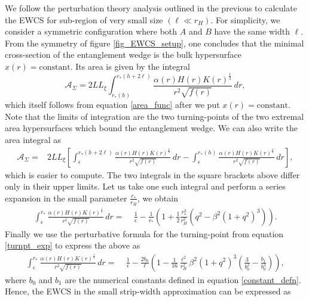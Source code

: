 \documentclass[12pt,a4paper]{article}
\numberwithin{equation}{section}
\begin{document}
We follow the perturbation theory analysis outlined in the previous to calculate the EWCS for sub-region of very small size $\left(\ell \ll r_H\right)$. For simplicity, we consider a symmetric configuration where both $A$ and $B$ have the same width $\ell$. From the symmetry of figure \ref{fig_EWCS_setup}, one concludes that the minimal cross-section of the entanglement wedge is the bulk hypersurface $x\left(r\right)=\mathrm{constant}$. Its area is given by the integral
%
\begin{equation} \label{area_func_EWCS}
	\mathcal{A}_{\Sigma} = 2 L L_{\xi} \int_{r_{\ast}\left(h\right)}^{r_{\ast}\left(h+2\ell\right)} \frac{\alpha(r) H(r) K(r)^\frac{1}{3}}{r^2 \sqrt{f\left(r\right)}}\,dr ,
\end{equation}
%
which itself follows from equation \eqref{area_func} after we put $x(r)=\text{constant}$. Note that the limits of integration are the two turning-points of the two extremal area hypersurfaces which bound the entanglement wedge. We can also write the area integral as
%
\begin{align} \label{area_func_EWCS}
	\mathcal{A}_{\Sigma} = &2 L L_{\xi} \left[ \int_{\epsilon}^{r_{\ast}\left(h+2\ell\right)} \frac{\alpha(r) H(r) K(r)^\frac{1}{3}}{r^2 \sqrt{f\left(r\right)}}\,dr - \int_{\epsilon}^{r_{\ast}\left(h\right)} \frac{\alpha(r) H(r) K(r)^\frac{1}{3}}{r^2 \sqrt{f\left(r\right)}}\,dr \right],
\end{align}
%
which is easier to compute. The two integrals in the square brackets above differ only in their upper limits. Let us take one such integral and perform a series expansion in the small parameter $\frac{r_{\ast}}{r_H}$, we obtain
%
\begin{align*}
    \int_{\epsilon}^{r_{\ast}} \frac{\alpha(r) H(r) K(r)^\frac{1}{3}}{r^2 \sqrt{f\left(r\right)}}\,dr =\; & \frac{1}{\epsilon} - \frac{1}{r_{\ast}} \left( 1 + \frac{1}{2} \frac{r_{\ast}^2}{r_H^2} \left( q^2 - \beta^2 \left(1 + q^2\right)^3 \right) \right).
\end{align*}
%
Finally we use the perturbative formula for the turning-point from equation \eqref{turnpt_exp} to express the above as
%
\begin{align}
    \int_{\epsilon}^{r_{\ast}} \frac{\alpha(r) H(r) K(r)^\frac{1}{3}}{r^2 \sqrt{f\left(r\right)}}\,dr =\; & \frac{1}{\epsilon} - \frac{2 b_0}{\ell} \left(1 - \frac{1}{16} \frac{\ell^2}{r_H^2} \beta^2\left(1+q^2\right)^3 \left(\frac{3}{b_0^2} - \frac{b_1}{b_0^3} \right) \right),
\end{align}
%
where $b_0$ and $b_1$ are the numerical constants defined in equation \eqref{constant_defn}. Hence, the EWCS in the small strip-width approximation can be expressed as
\end{document}
